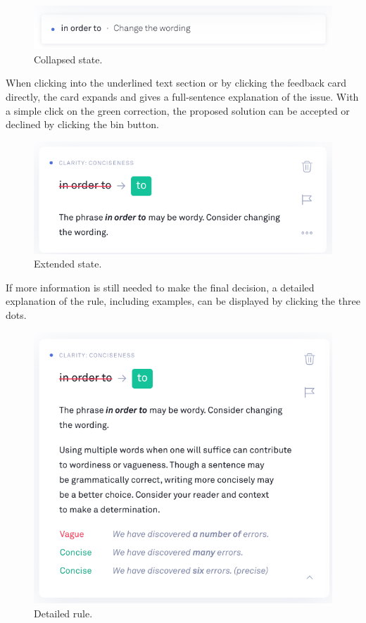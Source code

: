 \documentclass[runningheads]{llncs}
\begin{document}
\begin{figure}[H]
  \includegraphics[width=\linewidth]{images/state_1.png}
  \caption{Collapsed state.}
  \label{fig:state1}
\end{figure}

When clicking into the underlined text section or by clicking the feedback card directly, the card expands and gives a full-sentence explanation of the issue. With a simple click on the green correction, the proposed solution can be accepted or declined by clicking the bin button.
\begin{figure}[H]
  \includegraphics[width=\linewidth]{images/state_2.png}
  \caption{Extended state.}
  \label{fig:state2}
\end{figure}

If more information is still needed to make the final decision, a detailed explanation of the rule, including examples, can be displayed by clicking the three dots. 
\begin{figure}[H]
  \includegraphics[width=\linewidth]{images/state_3.png}
  \caption{Detailed rule.}
  \label{fig:state3}
\end{figure}
\end{document}
